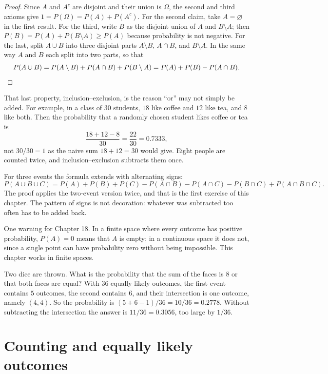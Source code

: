 \begin{proof}
Since $A$ and $A^{c}$ are disjoint and their union is $\Omega$, the second and third
axioms give $1=P(\Omega)=P(A)+P(A^{c})$. For the second claim, take $A=\varnothing$ in the
first result. For the third, write $B$ as the disjoint union of $A$ and
$B\setminus A$; then $P(B)=P(A)+P(B\setminus A)\ge P(A)$ because probability is not
negative. For the last, split $A\cup B$ into three disjoint parts $A\setminus B$,
$A\cap B$, and $B\setminus A$. In the same way $A$ and $B$ each split into two parts, so
that
\[
P(A\cup B)=P(A\setminus B)+P(A\cap B)+P(B\setminus A)
=P(A)+P(B)-P(A\cap B).\qedhere
\]
\end{proof}

That last property, inclusion--exclusion, is the reason ``or'' may not simply be added.
For example, in a class of $30$ students, $18$ like coffee and $12$ like tea, and $8$ like
both. Then the probability that a randomly chosen student likes coffee or tea is
\[
\frac{18+12-8}{30}=\frac{22}{30}=0.7333,
\]
not $30/30=1$ as the naive sum $18+12=30$ would give. Eight people are counted twice, and
inclusion--exclusion subtracts them once.

For three events the formula extends with alternating signs:
\[
P(A\cup B\cup C)=P(A)+P(B)+P(C)-P(A\cap B)-P(A\cap C)-P(B\cap C)+P(A\cap B\cap C).
\]
The proof applies the two-event version twice, and that is the first exercise of this
chapter. The pattern of signs is not decoration: whatever was subtracted too often has to
be added back.

One warning for Chapter 18. In a finite space where every outcome has positive probability,
$P(A)=0$ means that $A$ is empty; in a continuous space it does not, since a single point
can have probability zero without being impossible. This chapter works in finite spaces.

\begin{contoh}
Two dice are thrown. What is the probability that the sum of the faces is $8$ or that both
faces are equal? With $36$ equally likely outcomes, the first event contains $5$ outcomes,
the second contains $6$, and their intersection is one outcome, namely $(4,4)$. So the
probability is $(5+6-1)/36=10/36=0.2778$. Without subtracting the intersection the answer
is $11/36=0.3056$, too large by $1/36$.
\end{contoh}

\section{Counting and equally likely outcomes}

